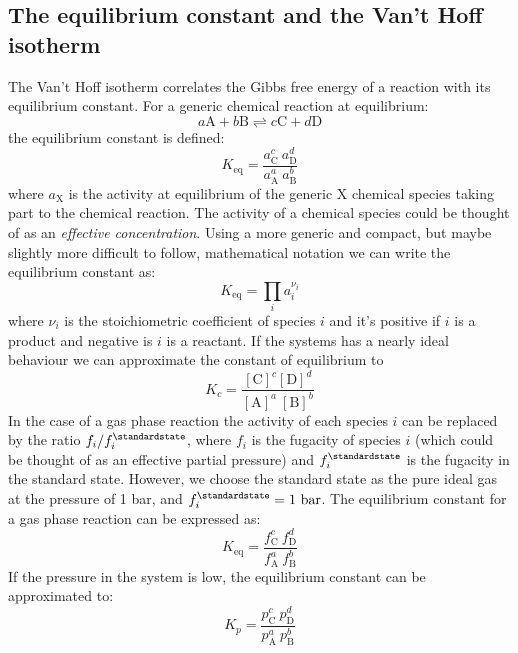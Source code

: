 \documentclass[12pt,a4paper]{report}
\begin{document}
   \subsection*{The equilibrium constant and the Van't Hoff isotherm}
   The Van't Hoff isotherm correlates the Gibbs free energy of a reaction with its equilibrium constant.
   For a generic chemical reaction at equilibrium:
   \begin{equation*}
   a\mathrm{A}+b\mathrm{B} \rightleftharpoons c\mathrm{C}+d\mathrm{D}
   \end{equation*}
   the equilibrium constant is defined:
   \begin{equation*}
   K_{\mathrm{eq}}=\frac{a_{\mathrm{C}}^{c}\ a_{\mathrm{D}}^{d}}{a_{\mathrm{A}}^{a}\  a_{\mathrm{B}}^{b}}
   \end{equation*}
   where $a_{\mathrm{X}}$ is the activity at equilibrium of the generic X chemical species taking part to the chemical reaction. The activity of a chemical species could be thought of as an \textit{effective concentration}. Using a more generic and compact, but maybe slightly more difficult to follow, mathematical notation we can write the equilibrium constant as:
   \begin{equation*}
   K_{\mathrm{eq}}=\prod\limits_{i} a_{i}^{\nu_{i}}
   \end{equation*}
   where $\nu_{i}$ is the stoichiometric coefficient of species $i$ and it's positive if $i$ is a product and negative is $i$ is a reactant.
   If the systems has a nearly ideal behaviour we can approximate the constant of equilibrium to 
   \begin{equation*}
   K_{c}=\frac{[\mathrm{C}]^{c} [\mathrm{D}]^{d}}{[\mathrm{A}]^{a}\  [\mathrm{B}]^{b}}
   \end{equation*}
   In the case of a gas phase reaction the activity of each species $i$ can be replaced by the ratio $f_{i}/f_{i}^{\standardstate}$, where $f_{i}$ is the fugacity of species $i$ (which could be thought of as an effective partial pressure) and $f_{i}^{\standardstate}$ is the fugacity in the standard state. However, we choose the standard state as the pure ideal gas at the pressure of 1 bar, and  $f_{i}^{\standardstate} = 1\ \mathrm{bar}$. The equilibrium constant for a gas phase reaction can be expressed as:
   \begin{equation*}
   K_{\mathrm{eq}}=\frac{f_{\mathrm{C}}^{c}\ f_{\mathrm{D}}^{d}}{f_{\mathrm{A}}^{a}\  f_{\mathrm{B}}^{b}}
   \end{equation*}
   If the pressure in the system is low, the equilibrium constant can be approximated to:
   \begin{equation*}
      K_{p}=\frac{p_{\mathrm{C}}^{c}\ p_{\mathrm{D}}^{d}}{p_{\mathrm{A}}^{a}\  p_{\mathrm{B}}^{b}}
   \end{equation*}
   
\end{document}
